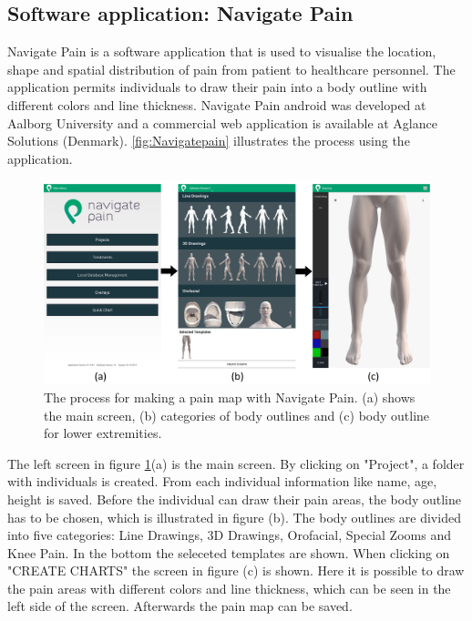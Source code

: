 \subsection{Software application: Navigate Pain} \label{sec:nav}
Navigate Pain is a software application that is used to visualise the location, shape and spatial distribution of pain from patient to healthcare personnel. The application permits individuals to draw their pain into a body outline with different colors and line thickness. Navigate Pain android was developed at Aalborg University and a commercial web application is available at Aglance Solutions (Denmark).\citep{Solutions2015}
\autoref{fig:Navigatepain} illustrates the process using the application.

\begin{figure} [H]
\centering
\includegraphics[width=1\textwidth]{figures/Navigatepain}
\caption{The process for making a pain map with Navigate Pain. (a) shows the main screen, (b) categories of body outlines and (c) body outline for lower extremities.}
\label{fig:Navigatepain}
\end{figure}

\noindent
The left screen in figure \ref{fig:Navigatepain}(a) is the main screen. By clicking on "Project", a folder with individuals is created. From each individual information like name, age, height is saved. Before the individual can draw their pain areas, the body outline has to be chosen, which is illustrated in figure (b). The body outlines are divided into five categories: Line Drawings, 3D Drawings, Orofacial, Special Zooms and Knee Pain. In the bottom the seleceted templates are shown. When clicking on "CREATE CHARTS" the screen in figure (c) is shown. Here it is possible to draw the pain areas with different colors and line thickness, which can be seen in the left side of the screen. Afterwards the pain map can be saved.


